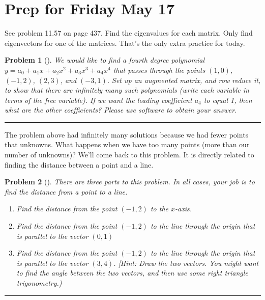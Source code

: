 \documentclass[letterpaper,oneside]{book}%
\theoremstyle{plain}
\theoremstyle{box}
\theoremstyle{problem}
\newtheorem{problemnum}{Problem}[chapter]
\newtheorem*{hwenum*}{Home Work Practice}
\newenvironment{problem}[1][]{\begin{problemnum}[#1]}{\end{problemnum}\nopagebreak\hrule\bigskip}
\newenvironment{hw*}[1][]{\begin{hwenum*}[#1]}{\end{hwenum*}\nopagebreak\hrule\bigskip}
\begin{document}
\section{Prep for Friday May 17}

\begin{hw*}
 See problem 11.57 on page 437. Find the eigenvalues for each matrix. Only find eigenvectors for one of the matrices.  That's the only extra practice for today.
\end{hw*}



\begin{problem}
 We would like to find a fourth degree polynomial $y=a_0+a_1x+a_2x^2+a_3x^3+a_4x^4$ that passes through the points $(1,0)$, $(-1,2)$, $(2,3)$, and $(-3,1)$.  Set up an augmented matrix, and row reduce it, to show that there are infinitely many such polynomials (write each variable in terms of the free variable).  If we want the leading coefficient $a_4$ to equal 1, then what are the other coefficients?  Please use software to obtain your answer. 
\end{problem}


The problem above had infinitely many solutions because we had fewer points that unknowns.  What happens when we have too many points (more than our number of unknowns)?  We'll come back to this problem.  It is directly related to finding the distance between a point and a line. 

\begin{problem}
There are three parts to this problem. In all cases, your job is to find the distance from a point to a line.
\begin{enumerate}
 \item Find the distance from the point $(-1,2)$ to the $x$-axis.
 \item Find the distance from the point $(-1,2)$ to the line through the origin that is parallel to the vector $(0,1)$
 \item Find the distance from the point $(-1,2)$ to the line through the origin that is parallel to the vector $(3,4)$.  [Hint: Draw the two vectors. You might want to find the angle between the two vectors, and then use some right triangle trigonometry.)
\end{enumerate}

\end{problem}
\end{document}
